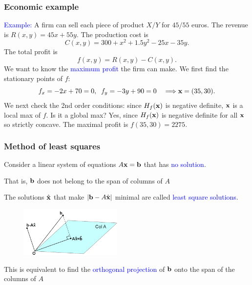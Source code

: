 \documentclass[11pt,aspectratio=169]{beamer}
\begin{document}
\begin{frame}
\frametitle{Economic example}
\begin{small}
 \textcolor{blue}{Example:} A firm can sell each piece of product $X/Y$ for $45/55$ euros. The revenue is $R(x,y)=45x+55y$. The production cost is
$$
C(x,y)=300+x^2+1.5 y^2-25 x- 35 y.$$ 
The total profit is
$$
f(x,y)=R(x,y)-C(x,y).
$$
We want to know the \textcolor{blue}{maximum profit} the firm can make. We first find the stationary points of $f$:
$$
f_x=-2x+70=0, \; \; f_y=-3y+90=0 \quad \Longrightarrow {\bf  x}=(35,30).
$$
We next check the 2nd order conditions:
since $H_f({\bf x})$ is negative definite, ${\bf x}$ is a local max of $f$.  Is it  a global  max? Yes, since $H_f({\bf x})$ is negative definite for all ${\bf x}$ so strictly concave. The maximal profit is $f(35,30)=2275$.


\end{small}
\end{frame}



\begin{frame}
\frametitle{Method of least squares}
\begin{small}
 Consider a linear system of equations $A {\bf x}={\bf b}$ that has \textcolor{blue}{no solution}.


\begin{tiny}That is, ${\bf b}$ does not belong to the span of columns of $A$\end{tiny}

\vskip 12pt
The solutions $\hat{{\bf x}}$ that make $\vert {\bf b}-A \hat{{\bf x}} \vert$ minimal are called \textcolor{blue}{least square solutions}.

\begin{figure}
\includegraphics[width=2in]{img/least_squares} 
\end{figure}

\begin{tiny} This is equivalent to find the \textcolor{blue}{orthogonal projection} of ${\bf b}$ onto the span of the columns of $A$ \end{tiny}


\end{small}
\end{frame}
\end{document}
